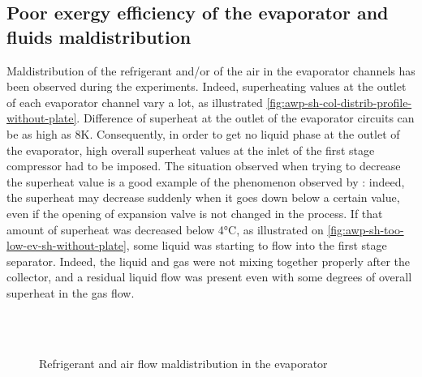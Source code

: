 \subsection{Poor exergy efficiency of the evaporator
  and fluids maldistribution}
\label{sec:awp-issue-reducing-oh}

Maldistribution of the refrigerant and/or of the air in the evaporator
channels has been observed during the experiments. Indeed,
superheating values at the outlet of each evaporator channel vary a
lot, as illustrated
\cref{fig:awp-sh-col-distrib-profile-without-plate}. Difference of
superheat at the outlet of the evaporator circuits can be as high as
8\si{\kelvin}. Consequently, in order to get no liquid phase at the
outlet of the evaporator, high overall superheat values at the inlet
of the first stage compressor had to be imposed. The situation
observed when trying to decrease the superheat value is a good example
of the phenomenon observed by \citet{chen-yezheng-2002a}: indeed, the
superheat may decrease suddenly when it goes down below a certain
value, even if the opening of expansion valve is not changed in the
process. If that amount of superheat was decreased below
4\si{\degreeCelsius}, as illustrated on
\cref{fig:awp-sh-too-low-ev-sh-without-plate}, some liquid was
starting to flow into the first stage separator. Indeed, the liquid
and gas were not mixing together properly after the collector, and a
residual liquid flow was present even with some degrees of overall
superheat in the gas flow.

\begin{figure}[htbp]
  \centering
  \hspace{1em}
  \\
  \hspace{1em}
  \\
  \hspace{0.5em}
  \hspace{5.8em}
  \hspace{5em}
  \caption{Refrigerant and air flow maldistribution in the evaporator}
  \label{fig:awp-maldistribution}
\end{figure}


